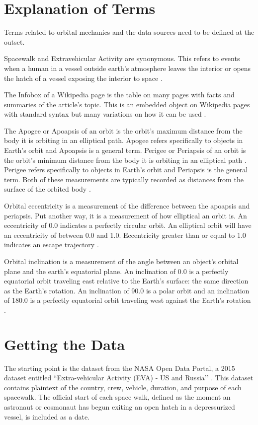 \documentclass[sigconf]{acmart}
\begin{document}
\section{Explanation of Terms}
Terms related to orbital mechanics and the data sources need to be defined at the outset.

Spacewalk and Extravehicular Activity are synonymous. This refers to events when a human in a vessel outside earth's atmosphere leaves the interior or opens the hatch of a vessel exposing the interior to space \cite{Aeronautics1995}. 

The Infobox of a Wikipedia page is the table on many pages with facts and summaries of the article's topic. This is an embedded object on Wikipedia pages with standard syntax but many variations on how it can be used \cite{Wikipedia17}.

The Apogee or Apoapsis of an orbit is the orbit's maximum distance from the body it is orbiting in an elliptical path. Apogee refers specifically to objects in Earth's orbit and Apoapsis is a general term. Perigee or Periapsis of an orbit is the orbit's minimum distance from the body it is orbiting in an elliptical path \cite{Wolfson2007}. Perigee refers specifically to objects in Earth's orbit and Periapsis is the general term. Both of these measurements are typically recorded as distances from the surface of the orbited body \cite{Muirden1982}.

Orbital eccentricity is a measurement of the difference between the apoapsis and periapsis. Put another way, it is a measurement of how elliptical an orbit is. An eccentricity of 0.0 indicates a perfectly circular orbit. An elliptical orbit will have an eccentricity of between 0.0 and 1.0. Eccentricity greater than or equal to 1.0 indicates an escape trajectory \cite{Muirden1982}. 

Orbital inclination is a measurement of the angle between an object's orbital plane and the earth's equatorial plane. An inclination of 0.0 is a perfectly equatorial orbit traveling east relative to the Earth's surface: the same direction as the Earth's rotation. An inclination of 90.0 is a polar orbit and an inclination of 180.0 is a perfectly equatorial orbit traveling west against the Earth's rotation \cite{Muirden1982}. 



\section{Getting the Data}
The starting point is the dataset from the NASA Open Data Portal, a 2015 dataset entitled ``Extra-vehicular Activity (EVA) - US and Russia’’ \cite{NASA2014}.  This dataset contains plaintext of the country, crew, vehicle, duration, and purpose of each spacewalk. The official start of each space walk, defined as the moment an astronaut or cosmonaut has begun exiting an open hatch in a depressurized vessel, is included as a date.
\end{document}
